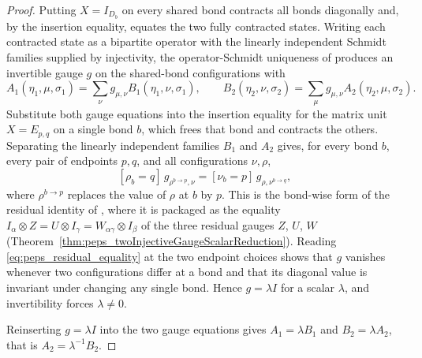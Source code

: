 \begin{proof}
    \leanok
    Putting $X=I_{D_b}$ on every shared bond contracts all bonds diagonally and,
    by the insertion equality, equates the two fully contracted states. Writing
    each contracted state as a bipartite operator with the linearly independent
    Schmidt families supplied by injectivity, the operator-Schmidt uniqueness of
    \cite[Section~3]{Molnar2018NormalPEPS} produces an invertible gauge $g$ on the
    shared-bond configurations with
    \[
        A_1(\eta_1,\mu,\sigma_1)=\sum_\nu g_{\mu,\nu}B_1(\eta_1,\nu,\sigma_1),
        \qquad
        B_2(\eta_2,\nu,\sigma_2)=\sum_\mu g_{\mu,\nu}A_2(\eta_2,\mu,\sigma_2).
    \]
    Substitute both gauge equations into the insertion equality for the
    matrix unit $X=E_{p,q}$ on a single bond $b$, which frees that bond and
    contracts the others. Separating the linearly independent families $B_1$ and
    $A_2$ gives, for every bond $b$, every pair of endpoints $p,q$, and all
    configurations $\nu,\rho$,
    \begin{equation}\label{eq:peps_residual_equality}
        [\rho_b=q]\,g_{\rho^{b\to p},\nu}=[\nu_b=p]\,g_{\rho,\nu^{b\to q}},
    \end{equation}
    where $\rho^{b\to p}$ replaces the value of $\rho$ at $b$ by $p$. This is the
    bond-wise form of the residual identity of
    \cite[Section~3]{Molnar2018NormalPEPS}, where it is packaged as the equality
    $I_\alpha\otimes Z=U\otimes I_\gamma=W_{\alpha\gamma}\otimes I_\beta$ of the
    three residual gauges $Z$, $U$, $W$
    (Theorem~\ref{thm:peps_twoInjectiveGaugeScalarReduction}). Reading
    \eqref{eq:peps_residual_equality} at the two endpoint choices shows that $g$
    vanishes whenever two configurations differ at a bond and that its diagonal
    value is invariant under changing any single bond. Hence $g=\lambda I$ for a
    scalar $\lambda$, and invertibility forces $\lambda\neq0$.

    Reinserting $g=\lambda I$ into the two gauge equations gives
    $A_1=\lambda B_1$ and $B_2=\lambda A_2$, that is
    $A_2=\lambda^{-1}B_2$.
\end{proof}

